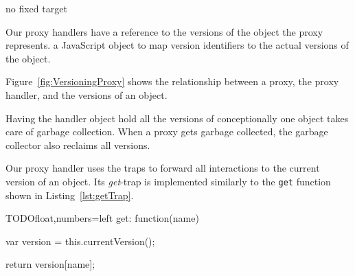 no fixed target

Our proxy handlers have a reference to the versions of the object the proxy represents.
 a JavaScript object to map version identifiers to the actual versions of the object.

Figure~\ref{fig:VersioningProxy} shows the relationship between a proxy, the proxy handler, and the versions of an object.

Having the handler object hold all the versions of conceptionally one object takes care of garbage collection.
When a proxy gets garbage collected, the garbage collector also reclaims all versions.


Our proxy handler uses the traps to forward all interactions to the current version of an object.
Its \emph{get}-trap is implemented similarly to the \lstinline{get} function shown in Listing~\ref{lst:getTrap}.

\begin{code}{TODO}{float,numbers=left}
get: function(name) {
    var version = this.currentVersion();
    
    return version[name];
}
\end{code}
\label{lst:getTrap}
\iffalse
\end{verbatim}\fi
% 








